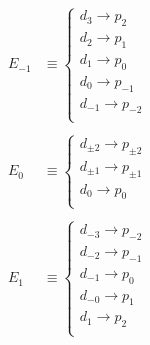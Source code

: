 \documentclass[ex, minted]{exercise_4.0}
\begin{document}

\begin{align*}
    E_{-1}& \equiv \begin{cases}
        d_{3} \to p_{2}\\
        d_{2} \to p_{1}\\
        d_{1} \to p_{0}\\
        d_{0} \to p_{-1}\\
        d_{-1} \to p_{-2}\\
    \end{cases}\\\\
    E_0&\equiv  \begin{cases}
        d_{\pm2} \to p_{\pm2}\\
        d_{\pm1} \to p_{\pm1}\\
        d_{0} \to p_{0}\\
    \end{cases}\\\\
    E_1 &\equiv  \begin{cases}
        d_{-3} \to p_{-2}\\
        d_{-2} \to p_{-1}\\
        d_{-1} \to p_{0}\\
        d_{-0} \to p_{1}\\
        d_{1} \to p_{2}\\
    \end{cases}\\
\end{align*}
\end{document}
